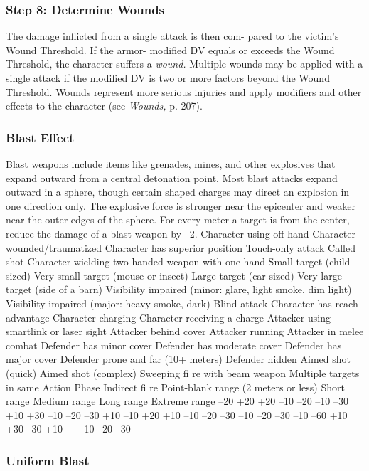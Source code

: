 \subsubsection{Step 8: Determine Wounds}

The damage inflicted from a single attack is then com-
pared to the victim's Wound Threshold. If the armor-
modified DV equals or exceeds the Wound Threshold, 
the character suffers a \textit{wound.} Multiple wounds may be 
applied with a single attack if the modified DV is two 
or more factors beyond the Wound Threshold. Wounds 
represent more serious injuries and apply modifiers and 
other effects to the character (see \textit{Wounds,} p. 207).

\subsubsection{Blast Effect}

Blast weapons include items like grenades, mines, and 
other explosives that expand outward from a central 
detonation point. Most blast attacks expand outward 
in a sphere, though certain shaped charges may direct 
an explosion in one direction only. The explosive force 
is stronger near the epicenter and weaker near the 
outer edges of the sphere. For every meter a target is 
from the center, reduce the damage of a blast weapon 
by –2.
Character using off-hand
Character wounded/traumatized
Character has superior position
Touch-only attack
Called shot
Character wielding two-handed weapon with one hand
Small target (child-sized)
Very small target (mouse or insect)
Large target (car sized)
Very large target (side of a barn)
Visibility impaired (minor: glare, light smoke, dim light)
Visibility impaired (major: heavy smoke, dark)
Blind attack
Character has reach advantage
Character charging
Character receiving a charge
Attacker using smartlink or laser sight
Attacker behind cover
Attacker running
Attacker in melee combat
Defender has minor cover
Defender has moderate cover
Defender has major cover
Defender prone and far (10+ meters)
Defender hidden
Aimed shot (quick)
Aimed shot (complex)
Sweeping ﬁ re with beam weapon
Multiple targets in same Action Phase
Indirect ﬁ re
Point-blank range (2 meters or less)
Short range
Medium range
Long range
Extreme range
–20
+20
+20
–10
–20
–10
–30
+10
+30
–10
–20
–30
+10
–10
+20
+10
–10
–20
–30
–10
–20
–30
–10
–60
+10
+30
–30
+10
—
–10
–20
–30

\subsubsection{Uniform Blast}

